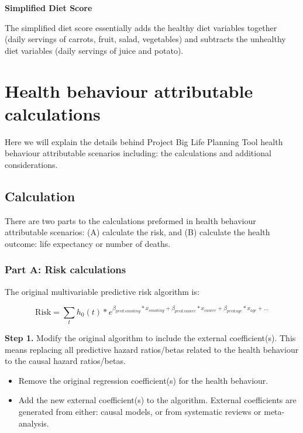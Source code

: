 \documentclass[]{book}
\providecommand{\tightlist}{%
  \setlength{\itemsep}{0pt}\setlength{\parskip}{0pt}}
\begin{document}
\textbf{Simplified Diet Score}

The simplified diet score essentially adds the healthy diet variables together (daily servings of carrots, fruit, salad, vegetables) and subtracts the unhealthy diet variables (daily servings of juice and potato).

\hypertarget{health-behaviour-attributable-calculations}{%
\chapter{Health behaviour attributable calculations}\label{health-behaviour-attributable-calculations}}

Here we will explain the details behind Project Big Life Planning Tool health behaviour attributable scenarios including: the calculations and additional considerations.

\hypertarget{calculation}{%
\section{Calculation}\label{calculation}}

There are two parts to the calculations preformed in health behaviour attributable scenarios: (A) calculate the risk, and (B) calculate the health outcome: life expectancy or number of deaths.

\hypertarget{part-a-risk-calculations}{%
\subsection{Part A: Risk calculations}\label{part-a-risk-calculations}}

The original multivariable predictive risk algorithm is:

\[ \text{Risk} = \sum_t h_0(t) * e^{\beta_{pred.smoking}*x_{smoking}+\beta_{pred.cancer}*x_{cancer} + \beta_{pred.age}*x_{age} +...}  \]

\textbf{Step 1.} Modify the original algorithm to include the external coefficient(s). This means replacing all predictive hazard ratios/betas related to the health behaviour to the causal hazard ratios/betas.

\begin{itemize}
\tightlist
\item
  Remove the original regression coefficient(s) for the health behaviour.
\item
  Add the new external coefficient(s) to the algorithm. External coefficients are generated from either: causal models, or from systematic reviews or meta-analysis.
\end{itemize}
\end{document}
